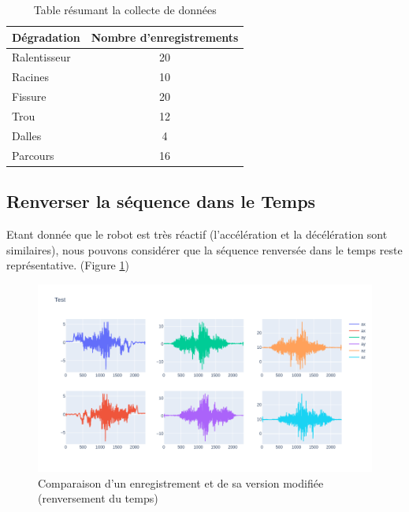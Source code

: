 \begin{table}[]
    \begin{tabular}{|l|c|}
    \hline
    Dégradation  & \multicolumn{1}{l|}{Nombre d'enregistrements} \\ \hline
    Ralentisseur & 20                                            \\ \hline
    Racines      & 10                                            \\ \hline
    Fissure      & 20                                            \\ \hline
    Trou         & 12                                            \\ \hline
    Dalles       & 4                                             \\ \hline
    Parcours     & 16                                            \\ \hline
    \end{tabular}
    \caption{Table résumant la collecte de données}
    \label{data_collection_table}
\end{table}

\subsection{Renverser la séquence dans le Temps}
Etant donnée que le robot est très réactif (l'accélération et la décélération sont similaires), nous pouvons considérer que la séquence renversée dans le temps reste représentative. (Figure \ref{data_augmentation_1})

\begin{figure}
    \center
    \includegraphics[scale=0.5]{img/reversed_data.png}
    \caption{Comparaison d'un enregistrement et de sa version modifiée (renversement du temps)}
    \label{data_augmentation_1}
\end{figure}

